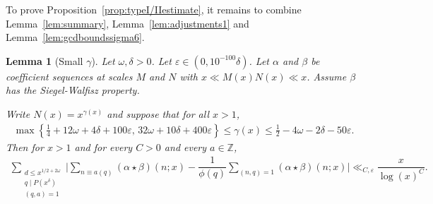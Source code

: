 \documentclass{amsart}
\newtheorem{lemma}{Lemma}
\numberwithin{equation}{section}
\begin{document}
To prove Proposition~\ref{prop:typeI/IIestimate}, it remains to combine Lemma~\ref{lem:summary}, Lemma~\ref{lem:adjustments1} and Lemma~\ref{lem:gcdboundssigma6}.  

\begin{lemma}[Small $\gamma$] \label{lem:proofofprop1}
Let $\omega, \delta >0$. Let $\varepsilon \in (0, 10^{-100}\delta)$. Let $\alpha$ and $\beta$ be coefficient sequences at scales $M$ and $N$ with $x \ll M(x)N(x) \ll x$.   Assume $\beta$ has the Siegel-Walfisz property. 

\vspace{3mm}
Write $N(x)=x^{\gamma(x)}$ and suppose that for all $x>1$,
\begin{align*}
\max\left\{\frac{1}{4}+12 \omega+4\delta+100\varepsilon, \, 32\omega + 10\delta+400\varepsilon\right\}\leq \gamma(x)  \leq  \frac{1}{2}-4\omega-2\delta-50\varepsilon.  
\end{align*}
Then for $x>1$ and for every $C >0$ and every $a \in \mathbb{Z}$,
\begin{align} \label{equ:equiestimate}
\sum_{\substack{d \leq x^{1/2+2\omega} \\ q \mid P(x^\delta) \\ (q,a)=1}}\Bigg| \sum_{n \equiv a(q)} (\alpha \star \beta)(n;x) - \dfrac{1}{\phi(q)} \sum_{(n,q)=1} (\alpha \star \beta)(n;x)\Bigg| \ll_{C,\varepsilon}  \dfrac{x}{\log(x)^C}.
\end{align}
\end{lemma}
\end{document}
